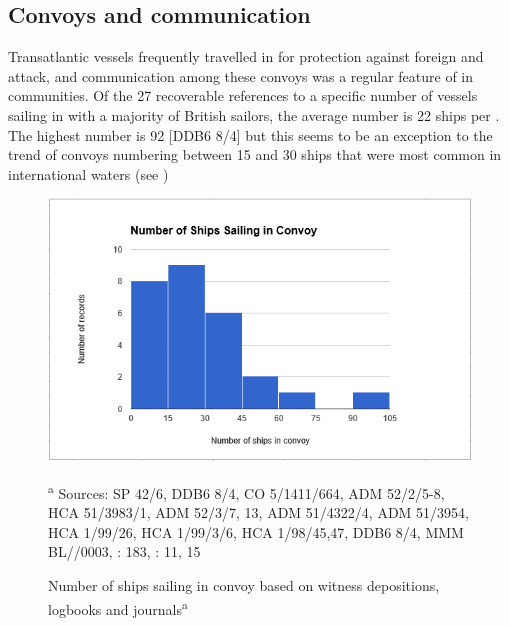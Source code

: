 \subsection{{Convoys and communication}}%

Transatlantic vessels frequently travelled in  for protection against foreign and  attack, and communication among these convoys was a regular feature of  in  communities. Of the 27 recoverable references to a specific number of vessels sailing in  with a majority of British sailors, the average number is 22 ships per . The highest number is 92 [DDB6 8/4] but this seems to be an exception to the trend of convoys numbering between 15 and 30 ships that were most common in international waters (see ) 

\begin{figure}
\includegraphics[width=\textwidth]{figures/delgado-img15.png}
\caption{\label{fig:key:4.7} Number of ships sailing in convoy based on witness depositions, logbooks and journals\textsuperscript{a}}

\textsuperscript{a} Sources: SP 42/6, DDB6 8/4, CO 5/1411/664, ADM 52/2/5-8, HCA 51/3983/1, ADM 52/3/7, 13, ADM 51/4322/4, ADM 51/3954, HCA 1/99/26, HCA 1/99/3/6, HCA 1/98/45,47, DDB6 8/4, MMM BL/\citealt{Egerton2395}/0003, \citealt{Bicheno2012}: 183, \citealt{Gage1648}: 11, 15
\end{figure}

